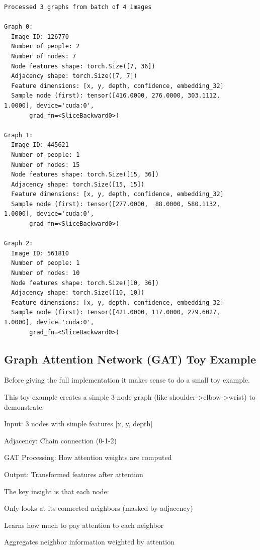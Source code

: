 \begin{lstlisting}[style=bashstyle,title={Preprocessing May Main test output},label={code:preprocessing_may_main_test_ouput}]
Processed 3 graphs from batch of 4 images

Graph 0:
  Image ID: 126770
  Number of people: 2
  Number of nodes: 7
  Node features shape: torch.Size([7, 36])
  Adjacency shape: torch.Size([7, 7])
  Feature dimensions: [x, y, depth, confidence, embedding_32]
  Sample node (first): tensor([416.0000, 276.0000, 303.1112,   1.0000], device='cuda:0',
       grad_fn=<SliceBackward0>)

Graph 1:
  Image ID: 445621
  Number of people: 1
  Number of nodes: 15
  Node features shape: torch.Size([15, 36])
  Adjacency shape: torch.Size([15, 15])
  Feature dimensions: [x, y, depth, confidence, embedding_32]
  Sample node (first): tensor([277.0000,  88.0000, 580.1132,   1.0000], device='cuda:0',
       grad_fn=<SliceBackward0>)

Graph 2:
  Image ID: 561810
  Number of people: 1
  Number of nodes: 10
  Node features shape: torch.Size([10, 36])
  Adjacency shape: torch.Size([10, 10])
  Feature dimensions: [x, y, depth, confidence, embedding_32]
  Sample node (first): tensor([421.0000, 117.0000, 279.6027,   1.0000], device='cuda:0',
       grad_fn=<SliceBackward0>)
\end{lstlisting}

\subsection{Graph Attention Network (GAT) Toy Example}

Before giving the full implementation it makes sense to do a small toy example.

This toy example creates a simple 3-node graph (like shoulder->elbow->wrist) to demonstrate:

\begin{compactitem}
   \item Input: 3 nodes with simple features [x, y, depth]
   \item Adjacency: Chain connection (0-1-2)
   \item GAT Processing: How attention weights are computed
   \item Output: Transformed features after attention
\end{compactitem}

The key insight is that each node:

\begin{compactitem}
   \item Only looks at its connected neighbors (masked by adjacency)
   \item Learns how much to pay attention to each neighbor
   \item Aggregates neighbor information weighted by attention
\end{compactitem}

